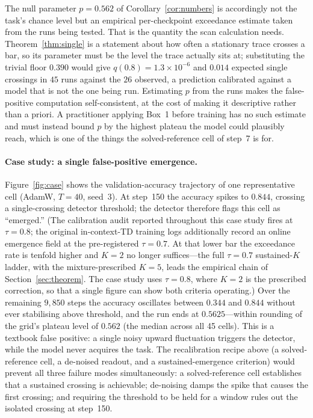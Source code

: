 \documentclass[11pt]{article}
\theoremstyle{plain}
\theoremstyle{definition}
\begin{document}
The null parameter $p=0.562$ of Corollary~\ref{cor:numbers} is accordingly not the task's
chance level but an empirical per-checkpoint exceedance estimate taken from the runs being
tested. That is the quantity the scan calculation needs. Theorem~\ref{thm:single} is a
statement about how often a stationary trace crosses a bar, so its parameter must be the
level the trace actually sits at; substituting the trivial floor $0.390$ would give
$q(0.8)=1.3\times10^{-6}$ and $0.014$ expected single crossings in $45$ runs against the
$26$ observed, a prediction calibrated against a model that is not the one being run.
Estimating $p$ from the runs makes the false-positive computation self-consistent, at the
cost of making it descriptive rather than a priori. A practitioner applying Box~1 before
training has no such estimate and must instead bound $p$ by the highest plateau the model
could plausibly reach, which is one of the things the solved-reference cell of step~7 is
for.

\paragraph{Case study: a single false-positive emergence.}

Figure~\ref{fig:case} shows the validation-accuracy trajectory of one representative cell
(AdamW, $T=40$, seed~3).
At step~150 the accuracy spikes to $0.844$, crossing a single-crossing detector threshold;
the detector therefore flags this cell as ``emerged.'' (The calibration audit reported throughout
this case study fires at $\tau=0.8$; the original in-context-TD training logs additionally record an
online emergence field at the pre-registered $\tau=0.7$. At that lower bar the exceedance
rate is tenfold higher and $K=2$ no longer suffices---the full $\tau=0.7$ sustained-$K$
ladder, with the mixture-prescribed $K=5$, leads the empirical chain of
Section~\ref{sec:theorem}. The case study uses $\tau=0.8$, where $K=2$ is the prescribed
correction, so that a single figure can show both criteria operating.)
Over the remaining $9{,}850$ steps the
accuracy oscillates between $0.344$ and $0.844$ without ever stabilising above threshold,
and the run ends at $0.5625$---within rounding of the grid's plateau level of $0.562$
(the median across all 45 cells). This is a textbook false positive: a single noisy
upward fluctuation triggers the detector, while the model never acquires the task. The
recalibration recipe above (a solved-reference cell, a de-noised readout, and a
sustained-emergence criterion) would prevent all three failure modes simultaneously: a
solved-reference cell establishes that a sustained crossing is achievable; de-noising
damps the spike that causes the first crossing; and requiring the threshold to be held for
a window rules out the isolated crossing at step~150.
\end{document}
